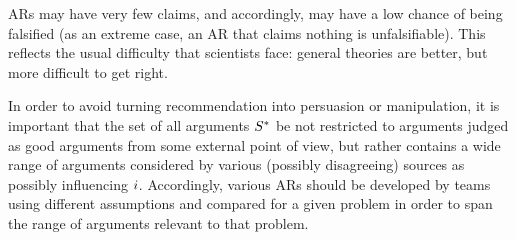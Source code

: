 \documentclass[french, english]{da2pl2018}
\begin{document}
\acp{AR} may have very few claims, and accordingly, may have a low chance of being falsified (as an extreme case, an \ac{AR} that claims nothing is unfalsifiable). This reflects the usual difficulty that scientists face: general theories are better, but more difficult to get right.

In order to avoid turning recommendation into persuasion or manipulation, it is important that the set of all arguments $S^*$ be not restricted to arguments judged as good arguments from some external point of view, but rather contains a wide range of arguments considered by various (possibly disagreeing) sources as possibly influencing $i$. Accordingly, various \acp{AR} should be developed by teams using different assumptions and compared for a given problem in order to span the range of arguments relevant to that problem.
\end{document}
